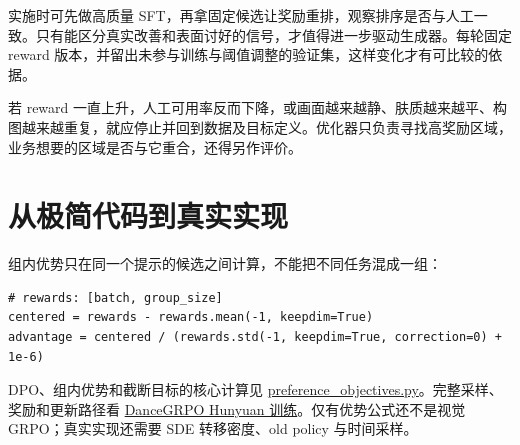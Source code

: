 实施时可先做高质量 SFT，再拿固定候选让奖励重排，观察排序是否与人工一致。只有能区分真实改善和表面讨好的信号，才值得进一步驱动生成器。每轮固定 reward 版本，并留出未参与训练与阈值调整的验证集，这样变化才有可比较的依据。

若 reward 一直上升，人工可用率反而下降，或画面越来越静、肤质越来越平、构图越来越重复，就应停止并回到数据及目标定义。优化器只负责寻找高奖励区域，业务想要的区域是否与它重合，还得另作评价。

\section{从极简代码到真实实现}\label{seedance-m09-ux4eceux6781ux7b80ux4ee3ux7801ux5230ux771fux5b9eux5b9eux73b0}

组内优势只在同一个提示的候选之间计算，不能把不同任务混成一组：

\begin{verbatim}
# rewards: [batch, group_size]
centered = rewards - rewards.mean(-1, keepdim=True)
advantage = centered / (rewards.std(-1, keepdim=True, correction=0) + 1e-6)
\end{verbatim}

DPO、组内优势和截断目标的核心计算见 \hyperref[code-preference-objectives]{preference\_objectives.py}。完整采样、奖励和更新路径看 \href{https://github.com/XueZeyue/DanceGRPO/blob/15cc71d53cc2e6e18a68ee607d5fb6ba9a99e344/fastvideo/train_grpo_hunyuan.py}{DanceGRPO Hunyuan 训练}。仅有优势公式还不是视觉 GRPO；真实实现还需要 SDE 转移密度、old policy 与时间采样。
